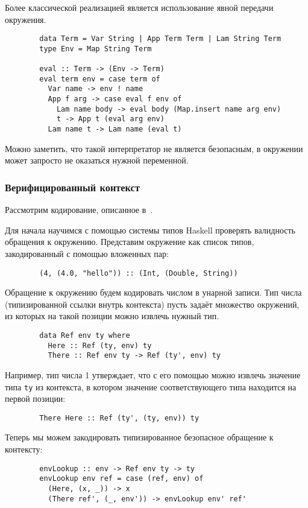 \documentclass[12pt]{article}
\begin{document}
    Более классической реализацией является использование явной передачи окружения.

    \begin{verbatim}
        data Term = Var String | App Term Term | Lam String Term
        type Env = Map String Term

        eval :: Term -> (Env -> Term)
        eval term env = case term of
          Var name -> env ! name
          App f arg -> case eval f env of
            Lam name body -> eval body (Map.insert name arg env)
            t -> App t (eval arg env)
          Lam name t -> Lam name (eval t)
    \end{verbatim}

    Можно заметить, что такой интерпретатор не является безопасным, в окружении может запросто не оказаться нужной переменной.

    \subsubsection{Верифицированный контекст}

    Рассмотрим кодирование, описанное в~\cite{kiselyov2012typed}.

    Для начала научимся с помощью системы типов Haskell проверять валидность обращения к окружению.
    Представим окружение как список типов, закодированный с помощью вложенных пар:
    \begin{verbatim}
        (4, (4.0, "hello")) :: (Int, (Double, String))
    \end{verbatim}

    Обращение к окружению будем кодировать числом в унарной записи.
    Тип числа (типизированной ссылки внутрь контекста) пусть задаёт множество окружений, из которых на такой позиции можно извлечь нужный тип.
    \begin{verbatim}
        data Ref env ty where
          Here :: Ref (ty, env) ty
          There :: Ref env ty -> Ref (ty', env) ty
    \end{verbatim}
    Например, тип числа 1 утверждает, что с его помощью можно извлечь значение типа \texttt{ty} из контекста, в котором значение соответствующего типа находится на первой позиции:
    \begin{verbatim}
        There Here :: Ref (ty', (ty, env)) ty
    \end{verbatim}

    Теперь мы можем закодировать типизированное безопасное обращение к контексту:
    \begin{verbatim}
        envLookup :: env -> Ref env ty -> ty
        envLookup env ref = case (ref, env) of
          (Here, (x, _)) -> x
          (There ref', (_, env')) -> envLookup env' ref'
    \end{verbatim}
\end{document}
